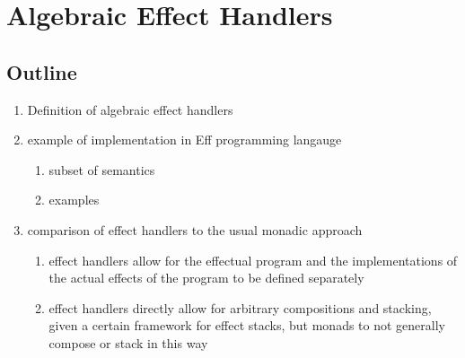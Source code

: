 \chapter{Algebraic Effect Handlers}

\section{Outline}
\begin{enumerate}
  \item Definition of algebraic effect handlers
  \item example of implementation in Eff programming langauge
  \begin{enumerate}
    \item subset of semantics
    \item examples
  \end{enumerate}
  \item comparison of effect handlers to the usual monadic approach
  \begin{enumerate}
    \item effect handlers allow for the effectual program and the implementations of the actual effects of the program to be defined separately
    \item effect handlers directly allow for arbitrary compositions and stacking, given a certain framework for effect stacks, but monads to not generally compose or stack in this way
  \end{enumerate}
\end{enumerate}

